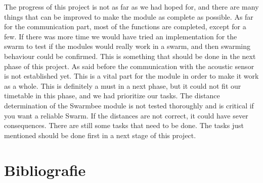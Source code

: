 \documentclass[10pt,a4paper]{article}
\begin{document}
The progress of this project is not as far as we had hoped for, and there are many things that can be improved to make the module as complete as possible. As far for the communication part, most of the functions are completed, except for a few. If there was more time we would have tried an implementation for the swarm to test if the modules would really work in a swarm, and then swarming behaviour could be confirmed. This is something that should be done in the next phase of this project. As said before the communication with the acoustic sensor is not established yet. This is a vital part for the module in order to make it work as a whole. This is definitely a must in a next phase, but it could not fit our timetable in this phase, and we had prioritize our tasks. The distance determination of the Swarmbee module is not tested thoroughly and is critical if you want a reliable Swarm. If the distances are not correct, it could have sever consequences. There are still some tasks that need to be done. The tasks just mentioned should be done first in a next stage of this project.


\newpage






\section{Bibliografie}


\end{document}
